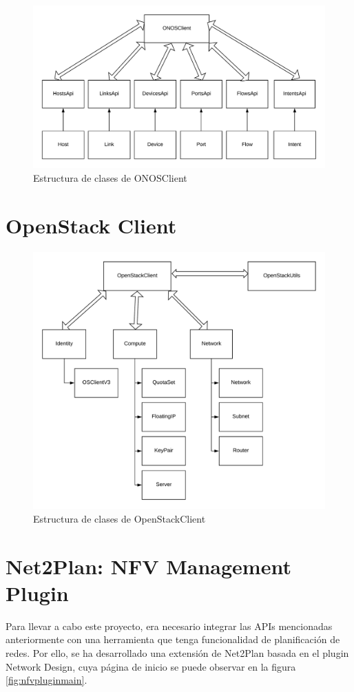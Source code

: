 \begin{figure}[!ht]
	\centering
	\includegraphics[width=0.8\linewidth]{imagenes/ONOSClient}
	\caption{Estructura de clases de ONOSClient}
	\label{fig:onosclient}
\end{figure}


\section{OpenStack Client}
\label{sec:openstackclient}

\begin{figure}[!ht]
	\centering
	\includegraphics[width=0.8\linewidth]{imagenes/OpenStackClient}
	\caption{Estructura de clases de OpenStackClient}
	\label{fig:openstackclient}
\end{figure}

\section{Net2Plan: NFV Management Plugin}
\label{sec:nfvplugin}

Para llevar a cabo este proyecto, era necesario integrar las APIs mencionadas anteriormente con una herramienta que tenga funcionalidad de planificación de redes. Por ello, se ha desarrollado una extensión de Net2Plan basada en el plugin Network Design, cuya página de inicio se puede observar en la figura \ref{fig:nfvpluginmain}.

